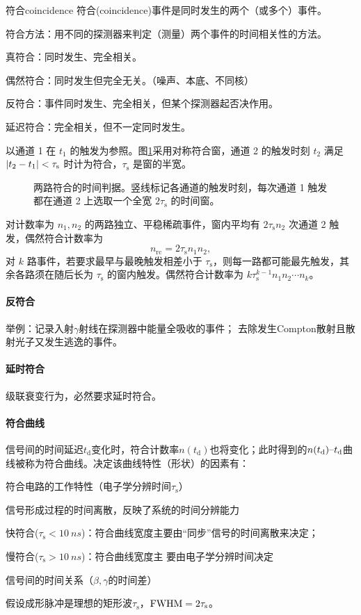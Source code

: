 \begin{definition}{符合}{coincidence}
	符合(coincidence)事件是同时发生的两个（或多个）事件。

	符合方法：用不同的探测器来判定（测量）两个事件的时间相关性的方法。

	真符合：同时发生、完全相关。

	偶然符合：同时发生但完全无关。（噪声、本底、不同核）

	反符合：事件同时发生、完全相关，但某个探测器起否决作用。

	延迟符合：完全相关，但不一定同时发生。
\end{definition}
以通道 1 在 $t_1$ 的触发为参照。图\ref{fig:coincidence-window}采用对称符合窗，通道 2 的触发时刻 $t_2$ 满足 $\abs{t_2 - t_1} < \tau_\mathrm s$ 时计为符合，$\tau_\mathrm s$ 是窗的半宽。
\begin{figure}[htbp]
    \centering{}
    \caption{两路符合的时间判据。竖线标记各通道的触发时刻，每次通道 1 触发都在通道 2 上选取一个全宽 $2\tau_\mathrm s$ 的时间窗。}
    \label{fig:coincidence-window}
\end{figure}

对计数率为 $n_1,n_2$ 的两路独立、平稳稀疏事件，窗内平均有 $2\tau_\mathrm s n_2$ 次通道 2 触发，偶然符合计数率为
\begin{equation}\label{eq:nrd-random-coincidence-rate}
	n_{\mathrm{rc}} = 2\tau_\mathrm sn_1n_2,
\end{equation}
对 $k$ 路事件，若要求最早与最晚触发相差小于 $\tau_\mathrm s$，则每一路都可能最先触发，其余各路须在随后长为 $\tau_\mathrm s$ 的窗内触发。偶然符合计数率为 $k\tau_\mathrm s^{k-1}n_1n_2\cdots n_k$。
\paragraph{反符合}
举例：记录入射$\gamma$射线在探测器中能量全吸收的事件；
去除发生Compton散射且散射光子又发生逃逸的事件。
\paragraph{延时符合}
级联衰变行为，必然要求延时符合。
\paragraph{符合曲线}
信号间的时间延迟$t_\mathrm d$变化时，符合计数率$n(t_\mathrm d)$也将变化；此时得到的$n(t_\mathrm d)\vs t_\mathrm d$曲线被称为符合曲线。决定该曲线特性（形状）的因素有：
\begin{compactitem}
	\item 符合电路的工作特性（电子学分辨时间$\tau_\mathrm s$）
	\item 信号形成过程的时间离散，反映了系统的时间分辨能力
	\begin{compactitem}
		\item 快符合($\tau_\mathrm s < \qty{10}{ns}$)：符合曲线宽度主要由“同步”信号的时间离散来决定；
		\item 慢符合($\tau_\mathrm s > \qty{10}{ns}$)：符合曲线宽度主
		要由电子学分辨时间决定
	\end{compactitem}
	\item 信号间的时间关系（$\beta,\gamma$的时间差）
\end{compactitem}
假设成形脉冲是理想的矩形波$\tau_\mathrm s$，$\FWHM = 2\tau_\mathrm s$。

